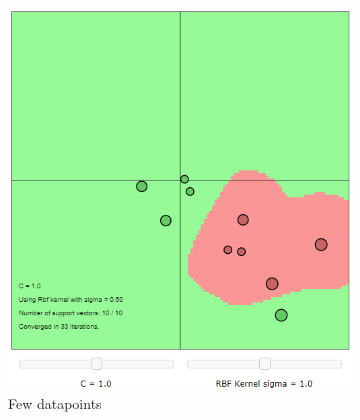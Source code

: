 \documentclass{article}
\begin{document}
        \begin{figure}[h]
             \centering
             \hspace{0.15\textwidth}
             \begin{subfigure}[b]{0.3\textwidth}
                 \centering
                 \includegraphics[width=\textwidth]{Assignment 1/figures/RBF_few_datapoints.png}
                 \caption{Few datapoints}
                 \label{fig:few_datapoints}
             \end{subfigure}
             \hfill
             \begin{subfigure}[b]{0.3\textwidth}
                 \centering

\end{subfigure}
\end{figure}
\end{document}

